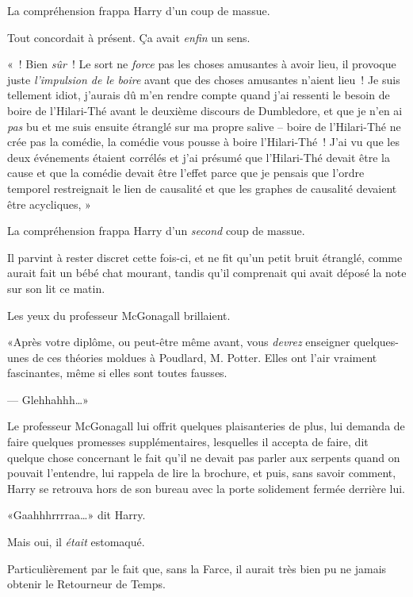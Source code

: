 La compréhension frappa Harry d'un coup de massue.

Tout concordait à présent. Ça avait \emph{enfin} un sens.

«~! Bien \emph{sûr}~! Le sort ne \emph{force} pas les choses amusantes à avoir lieu, il provoque juste \emph{l'impulsion de le boire} avant que des choses amusantes n'aient lieu~! Je suis tellement idiot, j'aurais dû m'en rendre compte quand j'ai ressenti le besoin de boire de l'Hilari-Thé avant le deuxième discours de Dumbledore, et que je n'en ai \emph{pas} bu et me suis ensuite étranglé sur ma propre salive -- boire de l'Hilari-Thé ne crée pas la comédie, la comédie vous pousse à boire l'Hilari-Thé~! J'ai vu que les deux événements étaient corrélés et j'ai présumé que l'Hilari-Thé devait être la cause et que la comédie devait être l'effet parce que je pensais que l'ordre temporel restreignait le lien de causalité et que les graphes de causalité devaient être acycliques, »

La compréhension frappa Harry d'un \emph{second} coup de massue.

Il parvint à rester discret cette fois-ci, et ne fit qu'un petit bruit étranglé, comme aurait fait un bébé chat mourant, tandis qu'il comprenait qui avait déposé la note sur son lit ce matin.

Les yeux du professeur McGonagall brillaient.

«Après votre diplôme, ou peut-être même avant, vous \emph{devrez} enseigner quelques-unes de ces théories moldues à Poudlard, M. Potter. Elles ont l'air vraiment fascinantes, même si elles sont toutes fausses.

--- Glehhahhh…»

Le professeur McGonagall lui offrit quelques plaisanteries de plus, lui demanda de faire quelques promesses supplémentaires, lesquelles il accepta de faire, dit quelque chose concernant le fait qu'il ne devait pas parler aux serpents quand on pouvait l'entendre, lui rappela de lire la brochure, et puis, sans savoir comment, Harry se retrouva hors de son bureau avec la porte solidement fermée derrière lui.

«Gaahhhrrrraa…» dit Harry.

Mais oui, il \emph{était} estomaqué.

Particulièrement par le fait que, sans la Farce, il aurait très bien pu ne jamais obtenir le Retourneur de Temps.

